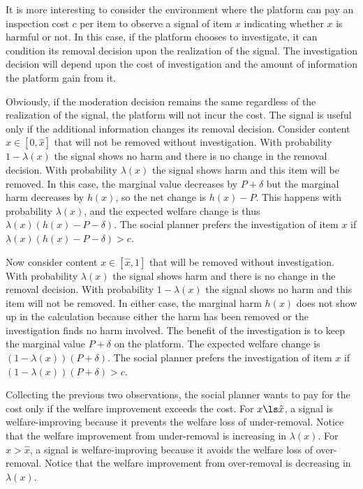 It is more interesting to consider the environment where the platform can pay an inspection cost $c$ per item to observe a signal of item $x$ indicating whether $x$ is harmful or not. In this case, if the platform chooses to investigate, it can condition its removal decision upon the realization of the signal. The investigation decision will depend upon the cost of investigation and the amount of information the platform gain from it.

Obviously, if the moderation decision remains the same regardless of the realization of the signal, the platform will not incur the cost. 
The signal is useful only if the additional information changes its removal decision. 
Consider content $x\in[0,\hat{x}]$ that will not be removed without investigation. With probability $1-\lambda(x)$ the signal shows no harm and there is no change in the removal decision. With probability $\lambda(x)$ the signal shows harm and this item will be removed. In this case, the marginal value decreases by $P+\delta$ but the marginal harm decreases by $h(x)$, so the net change is $h(x)-P$. This happens with probability $\lambda(x)$, and the expected welfare change is thus $\lambda(x)(h(x)-P-\delta)$.
The social planner prefers the investigation of item $x$ if $\lambda(x)(h(x)-P-\delta)>c$. 

Now consider content $x\in[\hat{x},1]$ that will be removed without investigation. With probability $\lambda(x)$ the signal shows harm and there is no change in the removal decision. With probability $1-\lambda(x)$ the signal shows no harm and this item will not be removed. In either case, the marginal harm $h(x)$ does not show up in the calculation because either the harm has been removed or the investigation finds no harm involved. The benefit of the investigation is to keep the marginal value $P+\delta$ on the platform. The expected welfare change is $(1-\lambda(x))(P+\delta)$. 
The social planner prefers the investigation of item $x$ if $(1-\lambda(x))(P+\delta)>c$. 

Collecting the previous two observations, the social planner wants to pay for the cost only if the welfare improvement exceeds the cost. For $x\ls \hat{x}$, a signal is welfare-improving because it prevents the welfare loss of under-removal. 
Notice that the welfare improvement from under-removal is increasing in $\lambda(x)$.
For $x>\hat{x}$, a signal is welfare-improving because it avoids the welfare loss of over-removal.
Notice that the welfare improvement from over-removal is decreasing in $\lambda(x)$.

